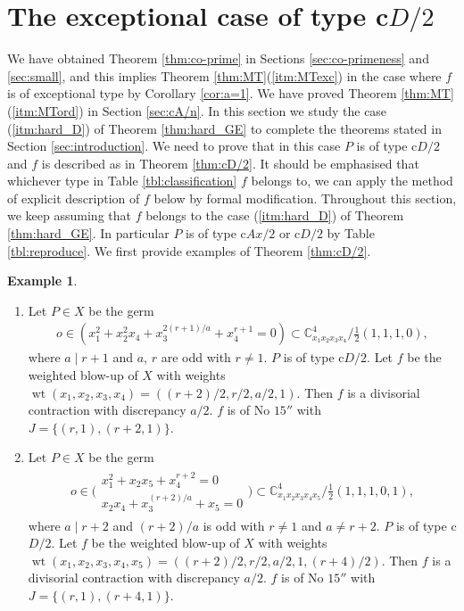\documentclass[a4paper,11pt]{amsart}
\theoremstyle{definition}
\newtheorem{example}[theorem]{Example}
\theoremstyle{remark}
\numberwithin{equation}{section}
\newcommand{\bC}{{\mathbb C}}
\newcommand{\wt}{\operatorname{wt}}
\begin{document}
\section{The exceptional case of type c$D/2$}\label{sec:cD/2}
We have obtained Theorem \ref{thm:co-prime}
in Sections \ref{sec:co-primeness} and \ref{sec:small},
and this implies Theorem \ref{thm:MT}(\ref{itm:MTexc})
in the case where $f$ is of exceptional type by Corollary \ref{cor:a=1}.
We have proved Theorem \ref{thm:MT}(\ref{itm:MTord}) in Section \ref{sec:cA/n}.
In this section
we study the case (\ref{itm:hard_D}) of Theorem \ref{thm:hard_GE}
to complete the theorems stated in Section \ref{sec:introduction}.
We need to prove that in this case $P$ is of type c$D/2$
and $f$ is described as in Theorem \ref{thm:cD/2}.
It should be emphasised that
whichever type in Table \ref{tbl:classification} $f$ belongs to,
we can apply the method of explicit description of $f$ below
by formal modification.
Throughout this section,
we keep assuming that $f$ belongs to the case (\ref{itm:hard_D}) of
Theorem \ref{thm:hard_GE}.
In particular $P$ is of type c$Ax/2$ or c$D/2$ by Table \ref{tbl:reproduce}.
We first provide examples of Theorem \ref{thm:cD/2}.

\begin{example}\label{exl:cD/2_15g}
\begin{enumerate}
\item
Let $P \in X$ be the germ
\begin{align*}
o \in (x_1^2+x_2^2x_4+x_3^{2(r+1)/a}+x_4^{r+1}=0)
\subset \bC^4_{x_1x_2x_3x_4} /\frac{1}{2}(1,1,1,0),
\end{align*}
where $a \mid r+1$ and $a$, $r$ are odd with $r \neq 1$.
$P$ is of type c$D/2$.
Let $f$ be the weighted blow-up of $X$
with weights $\wt(x_1,x_2,x_3,x_4)=((r+2)/2,r/2,a/2,1)$.
Then $f$ is a divisorial contraction with discrepancy $a/2$.
$f$ is of No $\textrm{15}''$ with $J=\{(r,1),(r+2,1)\}$.
\item
Let $P \in X$ be the germ
\begin{align*}
o \in \bigg(
\begin{array}{c}
x_1^2+x_2x_5+x_4^{r+2}=0 \\
x_2x_4+x_3^{(r+2)/a}+x_5=0
\end{array}
\bigg)
\subset \bC^4_{x_1x_2x_3x_4x_5} /\frac{1}{2}(1,1,1,0,1),
\end{align*}
where $a \mid r+2$ and $(r+2)/a$ is odd with $r \neq 1$ and $a \neq r+2$.
$P$ is of type c$D/2$.
Let $f$ be the weighted blow-up of $X$
with weights $\wt(x_1,x_2,x_3,x_4,x_5)=((r+2)/2,r/2,a/2,1,(r+4)/2)$.
Then $f$ is a divisorial contraction with discrepancy $a/2$.
$f$ is of No $\textrm{15}''$ with $J=\{(r,1),(r+4,1)\}$.
\end{enumerate}
\end{example}
\end{document}
